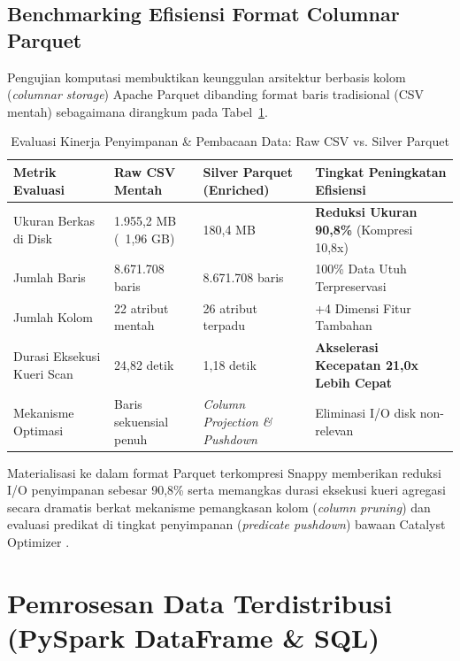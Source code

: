 \documentclass[11pt,a4paper]{article}
\begin{document}
\subsection{Benchmarking Efisiensi Format Columnar Parquet}
Pengujian komputasi membuktikan keunggulan arsitektur berbasis kolom (\textit{columnar storage}) Apache Parquet dibanding format baris tradisional (CSV mentah) sebagaimana dirangkum pada Tabel~\ref{tab:benchmark}.

\begin{table}[h]
\centering
\small
\caption{Evaluasi Kinerja Penyimpanan \& Pembacaan Data: Raw CSV vs. Silver Parquet}
\label{tab:benchmark}
\begin{tabularx}{\textwidth}{lXXX}
\toprule
\textbf{Metrik Evaluasi} & \textbf{Raw CSV Mentah} & \textbf{Silver Parquet (Enriched)} & \textbf{Tingkat Peningkatan Efisiensi} \\
\midrule
Ukuran Berkas di Disk & 1.955,2 MB (~1,96 GB) & 180,4 MB & \textbf{Reduksi Ukuran 90,8\%} (Kompresi 10,8x) \\
Jumlah Baris & 8.671.708 baris & 8.671.708 baris & 100\% Data Utuh Terpreservasi \\
Jumlah Kolom & 22 atribut mentah & 26 atribut terpadu & +4 Dimensi Fitur Tambahan \\
Durasi Eksekusi Kueri Scan & 24,82 detik & 1,18 detik & \textbf{Akselerasi Kecepatan 21,0x Lebih Cepat} \\
Mekanisme Optimasi & Baris sekuensial penuh & \textit{Column Projection \& Pushdown} & Eliminasi I/O disk non-relevan \\
\bottomrule
\end{tabularx}
\end{table}

Materialisasi ke dalam format Parquet terkompresi Snappy memberikan reduksi I/O penyimpanan sebesar 90,8\% serta memangkas durasi eksekusi kueri agregasi secara dramatis berkat mekanisme pemangkasan kolom (\textit{column pruning}) dan evaluasi predikat di tingkat penyimpanan (\textit{predicate pushdown}) bawaan Catalyst Optimizer \cite{zaharia2012}.

\section{Pemrosesan Data Terdistribusi (PySpark DataFrame \& SQL)}
\end{document}
